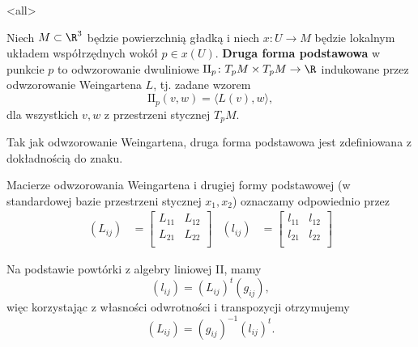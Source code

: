 \mode<all>{}
\begin{frame}

\begin{definicja}
Niech $M\subset \R^3$ będzie powierzchnią gładką i niech $x\colon U\to M$ będzie lokalnym układem współrzędnych wokół $p\in x(U)$. \pause\textbf{Druga forma podstawowa} w punkcie $p$ to odwzorowanie dwuliniowe $\text{II}_p\colon T_pM\times T_pM\to \R$ indukowane przez odwzorowanie Weingartena $L$\pause, tj. zadane wzorem
\[\text{II}_p(v,w)=\langle L(v),w\rangle,\]
dla wszystkich $v,w$ z przestrzeni stycznej $T_pM$.
\end{definicja}
\pause \begin{uwaga}
Tak jak odwzorowanie Weingartena, druga forma podstawowa jest zdefiniowana z dokładnością do znaku.
\end{uwaga}

\end{frame}
\begin{frame}[<+->]

\begin{uwaga}[Oznaczenie]
Macierze odwzorowania Weingartena i drugiej formy podstawowej (w standardowej bazie przestrzeni stycznej $x_1,x_2$) oznaczamy odpowiednio  przez 
\begin{align*}
(L_{ij})&=\left[
\begin{array}{cc}
L_{11}&L_{12}\\
L_{21}&L_{22}\\
\end{array}
\right]& (l_{ij})&=\left[
\begin{array}{cc}
l_{11}&l_{12}\\
l_{21}&l_{22}\\
\end{array}
\right]
\end{align*}
\end{uwaga}

\begin{wniosek}
Na podstawie powtórki z algebry liniowej II, mamy \[(l_{ij})=(L_{ij})^t(g_{ij}),\]więc korzystając z własności odwrotności i transpozycji otrzymujemy
\[(L_{ij})=(g_{ij})^{-1}(l_{ij})^t.\]
\end{wniosek}
\end{frame}
